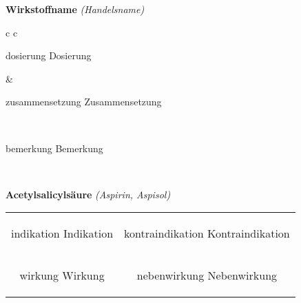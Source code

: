 \documentclass[12pt]{beamer}
\begin{document}
\begin{frame}{
    \textbf{Wirkstoffname}
    \textit{(Handelsname)}
}
    \begin{tabular}{c c}
        \begin{beamercolorbox}[wd=\boxwidth\textwidth,ht=\boxheight\textheight,sep=1em]{dosierung}
        Dosierung
        \end{beamercolorbox} & 
        \begin{beamercolorbox}[wd=\boxwidth\textwidth,ht=\boxheight\textheight,sep=1em]{zusammensetzung}
        Zusammensetzung
        \end{beamercolorbox} \\
        \begin{beamercolorbox}[wd=\textwidth,ht=\boxheight\textheight,sep=1em]{bemerkung}
        Bemerkung
        \end{beamercolorbox} \\
    \end{tabular}
\end{frame}

\begin{frame}{
    \textbf{Acetylsalicylsäure}
    \textit{(Aspirin, Aspisol)}
}
    \begin{tabular}{c c}
        \begin{beamercolorbox}[wd=\boxwidth\textwidth,ht=\boxheight\textheight,sep=1em]{indikation}
        Indikation
        \end{beamercolorbox} & 
        \begin{beamercolorbox}[wd=\boxwidth\textwidth,ht=\boxheight\textheight,sep=1em]{kontraindikation}
        Kontraindikation 
        \end{beamercolorbox} \\
        \begin{beamercolorbox}[wd=\boxwidth\textwidth,ht=\boxheight\textheight,sep=1em]{wirkung}
        Wirkung
        \end{beamercolorbox} & 
        \begin{beamercolorbox}[wd=\boxwidth\textwidth,ht=\boxheight\textheight,sep=1em]{nebenwirkung}
        Nebenwirkung
        \end{beamercolorbox} \\
    \end{tabular}
\end{frame}
\end{document}
